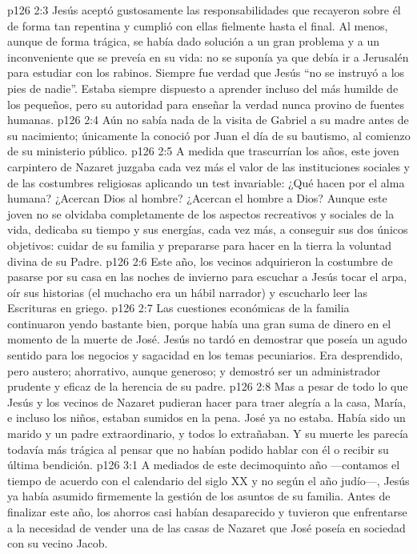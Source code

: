 \vs p126 2:3 Jesús aceptó gustosamente las responsabilidades que recayeron sobre él de forma tan repentina y cumplió con ellas fielmente hasta el final. Al menos, aunque de forma trágica, se había dado solución a un gran problema y a un inconveniente que se preveía en su vida: no se suponía ya que debía ir a Jerusalén para estudiar con los rabinos. Siempre fue verdad que Jesús “no se instruyó a los pies de nadie”. Estaba siempre dispuesto a aprender incluso del más humilde de los pequeños, pero su autoridad para enseñar la verdad nunca provino de fuentes humanas.
\vs p126 2:4 Aún no sabía nada de la visita de Gabriel a su madre antes de su nacimiento; únicamente la conoció por Juan el día de su bautismo, al comienzo de su ministerio público.
\vs p126 2:5 \pc A medida que trascurrían los años, este joven carpintero de Nazaret juzgaba cada vez más el valor de las instituciones sociales y de las costumbres religiosas aplicando un test invariable: ¿Qué hacen por el alma humana? ¿Acercan Dios al hombre? ¿Acercan el hombre a Dios? Aunque este joven no se olvidaba completamente de los aspectos recreativos y sociales de la vida, dedicaba su tiempo y sus energías, cada vez más, a conseguir sus dos únicos objetivos: cuidar de su familia y prepararse para hacer en la tierra la voluntad divina de su Padre.
\vs p126 2:6 \pc Este año, los vecinos adquirieron la costumbre de pasarse por su casa en las noches de invierno para escuchar a Jesús tocar el arpa, oír sus historias (el muchacho era un hábil narrador) y escucharlo leer las Escrituras en griego.
\vs p126 2:7 Las cuestiones económicas de la familia continuaron yendo bastante bien, porque había una gran suma de dinero en el momento de la muerte de José. Jesús no tardó en demostrar que poseía un agudo sentido para los negocios y sagacidad en los temas pecuniarios. Era desprendido, pero austero; ahorrativo, aunque generoso; y demostró ser un administrador prudente y eficaz de la herencia de su padre.
\vs p126 2:8 Mas a pesar de todo lo que Jesús y los vecinos de Nazaret pudieran hacer para traer alegría a la casa, María, e incluso los niños, estaban sumidos en la pena. José ya no estaba. Había sido un marido y un padre extraordinario, y todos lo extrañaban. Y su muerte les parecía todavía más trágica al pensar que no habían podido hablar con él o recibir su última bendición.
\vs p126 3:1 A mediados de este decimoquinto año ---contamos el tiempo de acuerdo con el calendario del siglo XX y no según el año judío---, Jesús ya había asumido firmemente la gestión de los asuntos de su familia. Antes de finalizar este año, los ahorros casi habían desaparecido y tuvieron que enfrentarse a la necesidad de vender una de las casas de Nazaret que José poseía en sociedad con su vecino Jacob.
